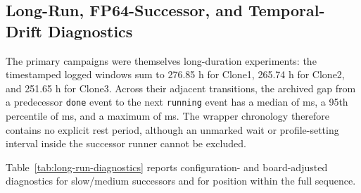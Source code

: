 \documentclass[electronics,article,submit,pdftex,moreauthors]{Definitions/mdpi}
\renewcommand{\tabref}[1]{Table~\ref{#1}}
\begin{document}
\subsection{Long-Run, FP64-Successor, and Temporal-Drift Diagnostics}

The primary campaigns were themselves long-duration experiments: the timestamped logged windows sum to 276.85 h for Clone1, 265.74 h for Clone2, and 251.65 h for Clone3. Across their \PrimaryAdjacentTransitionCount{} adjacent transitions, the archived gap from a predecessor \texttt{done} event to the next \texttt{running} event has a median of \PrimaryStateEventGapMedianMilliseconds{} ms, a 95th percentile of \PrimaryStateEventGapPninetyfiveMilliseconds{} ms, and a maximum of \PrimaryStateEventGapMaximumMilliseconds{} ms. The wrapper chronology therefore contains no explicit rest period, although an unmarked wait or profile-setting interval inside the successor runner cannot be excluded.

\tabref{tab:long-run-diagnostics} reports configuration- and board-adjusted diagnostics for slow/medium successors and for position within the full sequence.
\end{document}
